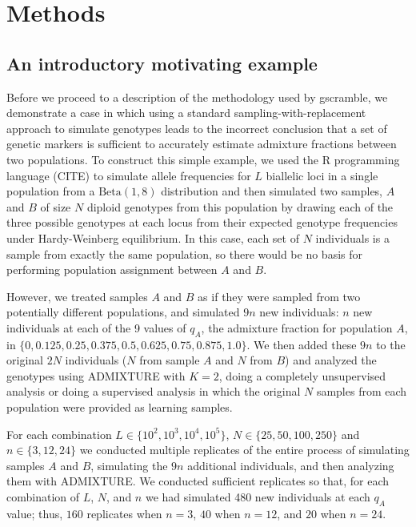   

\section*{Methods}

\subsection*{An introductory motivating example}

Before we proceed to a description of the methodology used by gscramble,
we demonstrate a case in which using a standard sampling-with-replacement
approach to simulate genotypes leads to the incorrect conclusion that a set of genetic
markers is sufficient to accurately estimate admixture fractions between two populations.
To construct this simple example, we used the R programming language (CITE) to
simulate allele frequencies for $L$ biallelic
loci in a single population from a $\mathrm{Beta}(1, 8)$ distribution and then simulated
two samples, $A$ and $B$ of size $N$ diploid genotypes from this population by drawing each of the three
possible genotypes at each locus from their
expected genotype frequencies under Hardy-Weinberg equilibrium.  In this case,
each set of $N$ individuals is a sample from exactly the same population, so
there would be no basis for performing population assignment between $A$ and $B$.  

However, we treated samples $A$ and $B$ as if they were sampled from two potentially different
populations, and simulated $9n$ new individuals: $n$ new individuals at each of the 9 values of
$q_A$, the admixture fraction for population $A$, in  $\{0, 0.125, 0.25, 0.375, 0.5, 0.625, 0.75, 0.875, 1.0\}$.
We then added these $9n$ to the original $2N$ individuals ($N$ from sample $A$ and $N$ from $B$)
and analyzed the genotypes using ADMIXTURE with $K=2$, doing a completely
unsupervised analysis or doing a supervised analysis in which the original $N$ samples from each
population were provided as learning samples. 

For each combination $L \in \{10^2, 10^3, 10^4, 10^5\}$, 
$N \in \{25, 50, 100, 250\}$ and $n\in\{3,12,24\}$ we conducted multiple replicates
of the entire process of
simulating samples $A$ and $B$, simulating the $9n$ additional individuals, and
then analyzing them with ADMIXTURE.  We conducted sufficient replicates so that,
for each combination of $L$, $N$, and $n$ we had simulated 480 new individuals
at each $q_A$ value; thus, $160$ replicates when $n = 3$, $40$ when $n=12$, and
$20$ when $n=24$.

